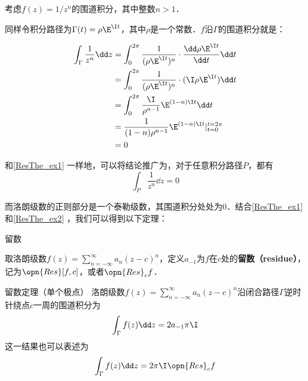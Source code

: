 \begin{example}{}\label{ResThe_ex2}
考虑$f(z)=1/z^n$的围道积分，其中整数$n>1$．

同样令积分路径为$\Gamma(t)=\rho\E^{\I t}$，其中$\rho$是一个常数．$f$沿$\Gamma$的围道积分就是：

\begin{equation}
\begin{aligned}
\int_{\Gamma}\frac{1}{z^n}\dd z&=\int^{2\pi}_0\frac{1}{(\rho\E^{\I t})^n}\cdot\frac{\dd\rho\E^{\I t}}{\dd t}\dd t\\
&=\int_0^{2\pi}\frac{1}{(\rho\E^{\I t})^n}\cdot (\I \rho \E^{\I t})\dd t\\
&=\int_0^{2\pi}\frac{\I}{\rho^{n-1}}\E^{(1-n)\I t}\dd t\\
&=\frac{1}{(1-n)\rho^{n-1}}\E^{(1-n)\I t}|^{t=2\pi}_{t=0}\\
&=0
\end{aligned}
\end{equation}

和\autoref{ResThe_ex1} 一样地，可以将结论推广为，对于任意积分路径$P$，都有
\begin{equation}
\int_P\frac{1}{z^n}\dd z=0
\end{equation}

\end{example}

而洛朗级数的正则部分是一个泰勒级数，其围道积分处处为$0$．结合\autoref{ResThe_ex1} 和\autoref{ResThe_ex2} ，我们可以得到以下定理：

\begin{definition}{留数}

取洛朗级数$f(z)=\sum\limits_{n=-\infty}^{\infty} a_n(z-c)^n$，定义$a_{-1}$为$f$在$c$处的\textbf{留数（residue）}，记为$\opn{Res}[f, c]$，或者$\opn{Res}_cf$．

\end{definition}

\begin{theorem}{留数定理（单个极点）}\label{ResThe_the1}
洛朗级数$f(z)=\sum\limits_{n=-\infty}^{\infty} a_n(z-c)^n$沿闭合路径$\Gamma$逆时针绕点$c$一周的围道积分为
\begin{equation}
\int_\Gamma f(z)\dd z=2a_{-1}\pi\I
\end{equation}
这一结果也可以表述为
\begin{equation}
\int_\Gamma f(z)\dd z=2\pi\I\opn{Res}_cf
\end{equation}

\end{theorem}


